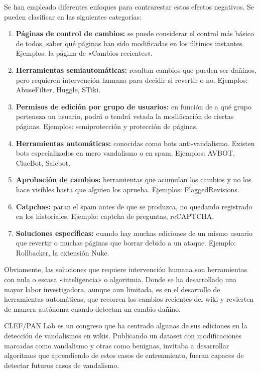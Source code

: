 \documentclass[11pt,onecolumn]{article}
\begin{document}
Se han empleado diferentes enfoques para contrarestar estos efectos negativos. Se pueden clasificar en las siguientes categorías:
\begin{enumerate}
\item \textbf{Páginas de control de cambios:} se puede considerar el control más básico de todos, saber qué páginas han sido modificadas en los últimos instantes. Ejemplos: la página de «Cambios recientes».
\item \textbf{Herramientas semiautomáticas:} resaltan cambios que pueden ser dañinos, pero requieren intervención humana para decidir si revertir o no. Ejemplos: AbuseFilter, Huggle, STiki.
\item \textbf{Permisos de edición por grupo de usuarios:} en función de a qué grupo perteneza un usuario, podrá o tendrá vetada la modificación de ciertas páginas. Ejemplos: semiprotección y protección de páginas.
\item \textbf{Herramientas automáticas:} conocidas como bots anti-vandalismo. Existen bots especializados en mero vandalismo o en spam. Ejemplos: AVBOT, ClueBot, Salebot.
\item \textbf{Aprobación de cambios:} herramientas que acumulan los cambios y no los hace visibles hasta que alguien los aprueba. Ejemplos: FlaggedRevisions.
\item \textbf{Catpchas:} paran el spam antes de que se produzca, no quedando registrado en los historiales. Ejemplo: captcha de preguntas, reCAPTCHA.
\item \textbf{Soluciones específicas:} cuando hay muchas ediciones de un mismo usuario que revertir o muchas páginas que borrar debido a un ataque. Ejemplo: Rollbacker, la extensión Nuke.
\end{enumerate}

Obviamente, las soluciones que requiere intervención humana son herramientas con nula o escasa «inteligencia» o algoritmia. Donde se ha desarrollado una mayor labor investigadora, aunque aun limitada, es en el desarrollo de herramientas automáticas, que recorren los cambios recientes del wiki y revierten de manera autónoma cuando detectan un cambio dañino.

CLEF/PAN Lab es un congreso que ha centrado algunas de sus ediciones en la detección de vandalismos en wikis. Publicando un dataset con modificaciones marcadas como vandalismo y otras como benignas, invitaba a desarrollar algoritmos que aprendiendo de estos casos de entreamiento, fueran capaces de detectar futuros casos de vandalismo.
\end{document}
